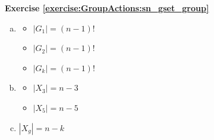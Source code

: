 \noindent\textbf{Exercise \ref{exercise:GroupActions:sn_gset_group}}
\begin{enumerate}[(a)]
\item
	\begin{itemize}
	\item
	$|G_1| = (n - 1)!$
	
	\item
	$|G_2| = (n - 1)!$
	
	\item
	$|G_k| = (n - 1)!$
	\end{itemize}
	
\item
	\begin{itemize}
	\item
	$|X_3| = n - 3$
	
	\item
	$|X_5| = n - 5$
	\end{itemize}
	
\item

$|X_g| = n - k$

\end{enumerate}

